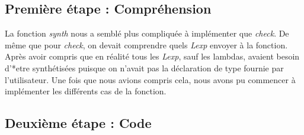 \documentclass{article}
\begin{document}
\subsection{Première étape : Compréhension}

La fonction \textit{synth} nous a semblé plus compliquée à implémenter que \textit{check}. De même que pour \textit{check}, on devait comprendre quels \textit{Lexp} envoyer à la fonction. Après avoir compris que en réalité tous les \textit{Lexp}, sauf les lambdas, avaient besoin d'*etre synthétisées puisque on n'avait pas la déclaration de type fournie par l'utilisateur. Une fois que nous avions compris cela, nous avons pu commencer à implémenter les différents cas de la fonction.

\subsection{Deuxième étape : Code}
\end{document}
